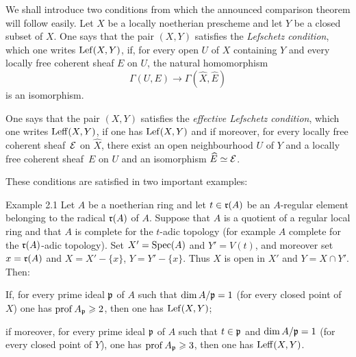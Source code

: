 We shall introduce two conditions from which the announced comparison
theorem will follow easily. Let $X$ be a locally noetherian prescheme
and let $Y$ be a closed subset of $X$. One says that the pair $(X, Y)$
satisfies the \emph{Lefschetz condition}, which one writes
$\operatorname{Lef}(X, Y)$,\label{pX.2} if, for every open $U$ of $X$ containing $Y$
and every locally free coherent sheaf $E$ on $U$, the natural
homomorphism
\[
\Gamma(U, E) \to \Gamma(\hat{X}, \hat{E})
\]
is an isomorphism.

One says that the pair $(X, Y)$ satisfies the \emph{effective Lefschetz
condition}, which one writes $\operatorname{Leff}(X, Y)$, if one has $\operatorname{Lef}(X, Y)$ and
if moreover, for every locally free coherent sheaf~${\mathcal E}$ on $\hat{X}$,
there exist an open neighbourhood $U$ of $Y$ and a locally free
coherent sheaf~$E$ on $U$ and an isomorphism $\widehat{E}\simeq{\mathcal E}$.

These conditions are satisfied in two important examples:

\label{X.2.1}
\begin{enonce*}[remark]{Example 2.1\ndemark}
 Let $A$ be a noetherian ring and let $t\in \mathfrak{r}(A)$ be an
$A$-regular element belonging to the radical $\mathfrak{r}(A)$ of $A$. Suppose
that $A$ is a quotient of a regular local ring and that $A$ is complete
for the $t$-adic topology (for example $A$ complete for the
$\mathfrak{r}(A)$-adic topology). Set $X'=\operatorname{Spec}(A)$ and $Y'=V(t)$, and moreover
set $x=\mathfrak{r}(A)$ and $X=X'-\{x\}$, $Y=Y'-\{x\}$. Thus $X$ is open in $X'$
and $Y=X\cap Y'$. Then:
\begin{enumeratei}
\item
If, for every prime ideal $\mathfrak{p}$ of $A$ such that $\dim A/\mathfrak{p}=1$
(\ie for every closed point of $X$) one has $\operatorname{prof} A_{\mathfrak{p}}\geqslant 2$,
then one has $\operatorname{Lef}(X, Y)$;

\item
if moreover, for every prime ideal $\mathfrak{p}$ of $A$ such that $t\in\mathfrak{p}$
and $\dim A/\mathfrak{p}=1$ (\ie for every closed point of $Y$), one has
$\operatorname{prof} A_{\mathfrak{p}}\geqslant 3$, then one has $\operatorname{Leff}(X, Y)$.
\end{enumeratei}
\end{enonce*}

